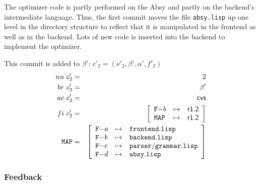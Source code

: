 \documentclass[fleqn, 10pt, a4paper]{report} \usepackage{amssymb}
\begin{document}
The optimizer code is partly performed on the Absy and partly on the
backend's intermediate language. Thus, the first commit moves the file
\texttt{absy.lisp} up one level in the directory structure to reflect
that it is manipulated in the frontend as well as in the backend. Lots
of new code is inserted into the backend to implement the optimizer.

This commit is added to $\beta'$: $c'_2=(\nu'_2, \beta', \alpha',
f'_2)$
\begin{eqnarray*}
  \mathnormal{nu}\ c'_2 &=& 2 \\
  \mathnormal{br}\ c'_2 &=& \beta' \\
  \mathnormal{ac}\ c'_2 &=& \mathsf{cvs} \\
  \mathnormal{fi}\ c'_2 &=& \left[
    \begin{array}{lcl}
      \mathtt{F-}b & \mapsto & \mathsf{r1.2} \\
      \mathtt{MAP} & \mapsto & \mathsf{r1.2} \\
    \end{array}\right] \\
  \mathtt{MAP} &=& \left[
    \begin{array}{lcl}
      \mathtt{F-}a &\mapsto& \mathtt{frontend.lisp} \\
      \mathtt{F-}b &\mapsto& \mathtt{backend.lisp} \\
      \mathtt{F-}c &\mapsto& \mathtt{parser/grammar.lisp} \\
      \mathtt{F-}d &\mapsto& \mathtt{absy.lisp} \\
    \end{array}\right]
\end{eqnarray*}

\subsubsection{Feedback}
\end{document}
